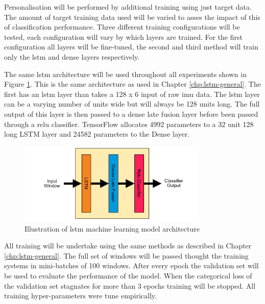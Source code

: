 Personalisation will be performed by additional training using just target data. The amount of target training data used will be varied to asses the impact of this of classification performance. Three different training configurations will be tested, each configuration will vary by which layers are trained. For the first configuration all layers will be fine-tuned, the second and third method will train only the \acrshort{lstm} and dense layers respectively.

The same \acrshort{lstm} architecture will be used throughout all experiments shown in Figure \ref{fig:ch5_illustration_of_base_LSTM_model}. This is the same architecture as used in Chapter \ref{chp:lstm-general}. The first has an \acrshort{lstm} layer than takes a 128 x 6 input of raw \acrshort{imu} data. The \acrshort{lstm} layer can be a varying number of units wide but will always be 128 units long. The full output of this layer is then passed to a dense late fusion layer before been passed through a \acrshort{relu} classifier. TensorFlow allocates 4992 parameters to a 32 unit 128 long LSTM layer and 24582 parameters to the Dense layer.

\begin{figure}[htbp]
    \centering
    \includegraphics[width=0.8\textwidth]{content/5-Personalisation/ch5_lstm_architecture.pdf}
    \caption[Illustration of  machine learning model architecture]{Illustration of \acrshort{lstm} machine learning model architecture}
    \label{fig:ch5_illustration_of_base_LSTM_model}
\end{figure}


All training will be undertake using the same methods as described in Chapter \ref{chp:lstm-general}. The full set of windows will be passed thought the training systems in mini-batches of 100 windows. After every epoch the validation set will be used to evaluate the performance of the model. When the categorical loss of the validation set stagnates for more than 3 epochs training will be stopped. All training hyper-parameters were tune empirically.

